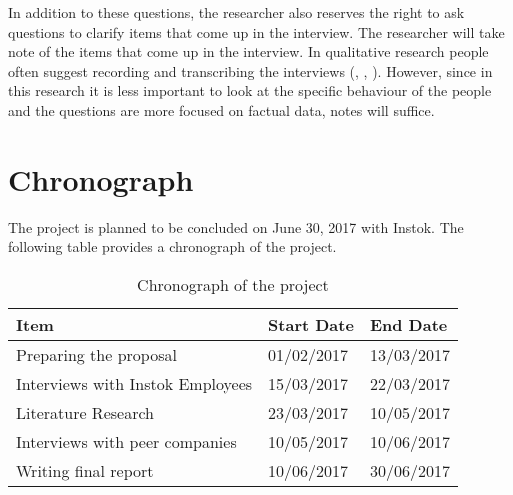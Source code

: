 \documentclass[man]{apa6}
\begin{document}
In addition to these questions, the researcher also reserves the right to ask questions to clarify items that come up in the interview. The researcher will take note of the items that come up in the interview. In qualitative research people often suggest recording and transcribing the interviews (\parencite{HUMBLE}, \parencite{BAILEY2008}, \parencite{THOMSON2014}). However, since in this research it is less important to look at the specific behaviour of the people and the questions are more focused on factual data, notes will suffice.

\section{Chronograph}
The project is planned to be concluded on June 30, 2017 with Instok. The following table provides a chronograph of the project.

\begin{table}[]
\centering
\caption{Chronograph of the project}
\label{chronograph}
\begin{tabular}{|l|l|l|}
\hline
Item                             & Start Date & End Date   \\ \hline
Preparing the proposal			 & 01/02/2017 & 13/03/2017 \\ \hline
Interviews with Instok Employees & 15/03/2017 & 22/03/2017 \\ \hline
Literature Research              & 23/03/2017 & 10/05/2017 \\ \hline
Interviews with  peer companies  & 10/05/2017 & 10/06/2017 \\ \hline
Writing final report             & 10/06/2017 & 30/06/2017 \\ \hline
\end{tabular}
\end{table}

\printbibliography

\end{document}

